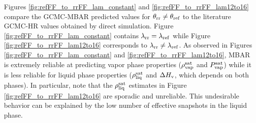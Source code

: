 \documentclass[journal=jced,manuscript=article]{achemso}
\begin{document}
Figures \ref{fig:refFF_to_rrFF_lam_constant} and \ref{fig:refFF_to_rrFF_lam12to16} compare the GCMC-MBAR predicted values for $\theta_{\rm rr} \neq \theta_{\rm ref}$ to the literature GCMC-HR values obtained by direct simulation. Figure \ref{fig:refFF_to_rrFF_lam_constant} contains $\lambda_{\rm rr} = \lambda_{\rm ref}$ while Figure \ref{fig:refFF_to_rrFF_lam12to16} corresponds to $\lambda_{\rm rr} \neq \lambda_{\rm ref}$. As observed in Figures \ref{fig:refFF_to_rrFF_lam_constant} and \ref{fig:refFF_to_rrFF_lam12to16}, MBAR is extremely reliable at predicting vapor phase properties ($\rho_{\rm vap}^{\rm sat}$ and $P_{\rm vap}^{\rm sat}$) while it is less reliable for liquid phase properties ($\rho_{\rm liq}^{\rm sat}$ and $\Delta H_{\rm v}$, which depends on both phases). In particular, note that the $\rho_{\rm liq}^{\rm sat}$ estimates in Figure \ref{fig:refFF_to_rrFF_lam12to16} are sporadic and unreliable. This undesirable behavior can be explained by the low number of effective snapshots in the liquid phase.
%



\end{document}
